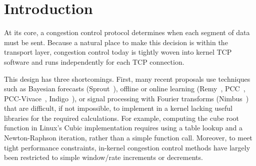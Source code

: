 \section{Introduction}

At its core, a congestion control protocol determines when each segment of data must be sent. Because a natural place to make this decision is within the transport layer, congestion control today is tightly woven into kernel TCP software and runs independently for each TCP connection.

This design has three shortcomings. First, many recent proposals use techniques such as Bayesian forecasts (Sprout~\cite{sprout}), offline or online learning (Remy~\cite{remy}, PCC~\cite{pcc}, PCC-Vivace~\cite{pcc-vivace}, Indigo~\cite{pantheon}), or signal processing with Fourier transforms (Nimbus~\cite{nimbus}) that are difficult, if not impossible, to implement in a kernel lacking useful libraries for the required calculations. For example, computing the cube root function in Linux's Cubic implementation requires using a table lookup and a Newton-Raphson iteration, rather than a simple function call. Moreover, to meet tight performance constraints, in-kernel congestion control methods have largely been restricted to simple window/rate increments or decrements.


